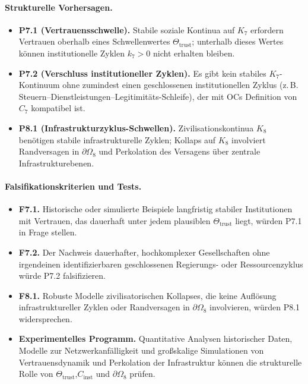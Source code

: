 {\paragraph{Strukturelle Vorhersagen.}
\begin{itemize}
  \item \textbf{P7.1 (Vertrauensschwelle).}
        Stabile soziale Kontinua auf \(K_7\) erfordern Vertrauen oberhalb eines
        Schwellenwertes \(\Theta_{\mathrm{trust}}\); unterhalb dieses Wertes können
        institutionelle Zyklen \(k_7>0\) nicht erhalten bleiben.
  \item \textbf{P7.2 (Verschluss institutioneller Zyklen).}
        Es gibt kein stabiles \(K_7\)-Kontinuum ohne zumindest einen geschlossenen
        institutionellen Zyklus (z.\,B. Steuern–Dienstleistungen–Legitimitäts-Schleife),
der mit OCs Definition von \(C_7\) kompatibel ist.
  \item \textbf{P8.1 (Infrastrukturzyklus-Schwellen).}
        Zivilisationskontinua \(K_8\) benötigen stabile infrastrukturelle Zyklen;
        Kollaps auf \(K_8\) involviert Randversagen in
        \(\partial\Omega_8\) und Perkolation des Versagens über zentrale
        Infrastrukturebenen.
\end{itemize}

\paragraph{Falsifikationskriterien und Tests.}
\begin{itemize}
  \item \textbf{F7.1.}
        Historische oder simulierte Beispiele langfristig stabiler Institutionen
        mit Vertrauen, das dauerhaft unter jedem plausiblen
        \(\Theta_{\mathrm{trust}}\) liegt, würden P7.1 in Frage stellen.
  \item \textbf{F7.2.}
        Der Nachweis dauerhafter, hochkomplexer Gesellschaften ohne irgendeinen
        identifizierbaren geschlossenen Regierungs- oder Ressourcenzyklus würde
        P7.2 falsifizieren.
  \item \textbf{F8.1.}
        Robuste Modelle zivilisatorischen Kollapses, die keine Auflösung
        infrastruktureller Zyklen oder Randversagen in
        \(\partial\Omega_8\) involvieren, würden P8.1 widersprechen.
  \item \textbf{Experimentelles Programm.}
        Quantitative Analysen historischer Daten, Modelle zur Netzwerkanfälligkeit
        und großskalige Simulationen von Vertrauensdynamik und Perkolation der
        Infrastruktur können die strukturelle Rolle von
        \(\Theta_{\mathrm{trust}}\),\(C_{\mathrm{inst}}\) und
        \(\partial\Omega_8\) prüfen.
\end{itemize}

}
